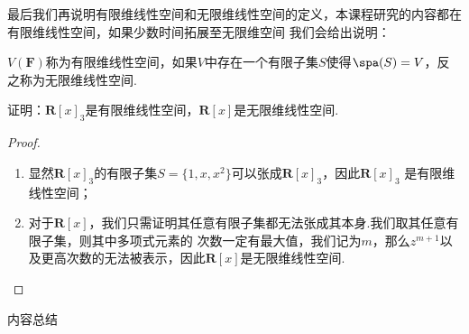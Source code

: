 最后我们再说明有限维线性空间和无限维线性空间的定义，本课程研究的内容都在有限维线性空间，如果少数时间拓展至无限维空间
我们会给出说明：
\begin{definition}
    $V(\mathbf{F})$称为有限维线性空间，如果$V$中存在一个有限子集$S$使得$\spa(S)=V$，反之称为无限维线性空间.
\end{definition}
\begin{example}
    证明：$\mathbf{R}[x]_3$是有限维线性空间，$\mathbf{R}[x]$是无限维线性空间.
\end{example}
\begin{proof}
    \begin{enumerate}
        \item 显然$\mathbf{R}[x]_3$的有限子集$S=\{1,x,x^2\}$可以张成$\mathbf{R}[x]_3$，因此$\mathbf{R}[x]_3$
        是有限维线性空间；
        \item 对于$\mathbf{R}[x]$，我们只需证明其任意有限子集都无法张成其本身.我们取其任意有限子集，则其中多项式元素的
        次数一定有最大值，我们记为$m$，那么$z^{m+1}$以及更高次数的无法被表示，因此$\mathbf{R}[x]$是无限维线性空间.
    \end{enumerate}
\end{proof}

\vspace{2ex}
\centerline{\heiti \Large 内容总结}

\vspace{2ex}

